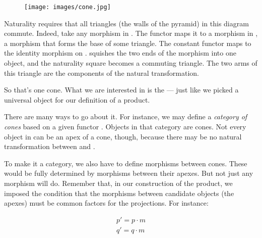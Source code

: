 \begin{figure}[H]
\centering
\texttt{[image: images/cone.jpg]}
\end{figure}

\noindent
Naturality requires that all triangles (the walls of the pyramid) in
this diagram commute. Indeed, take any morphism  in .
The functor  maps it to a morphism  in , a
morphism that forms the base of some triangle. The constant functor
 maps  to the identity morphism on
. \mathtext{\Delta} squishes the two ends of the morphism into one object, and
the naturality square becomes a commuting triangle. The two arms of this
triangle are the components of the natural transformation.

\begin{figure}[H]
\centering
{}
\end{figure}

\noindent
So that's one cone. What we are interested in is the  --- just like we picked a universal object for our definition of a
product.

There are many ways to go about it. For instance, we may define a
\emph{category of cones} based on a given functor . Objects in that
category are cones. Not every object  in  can be an
apex of a cone, though, because there may be no natural transformation
between  and .

To make it a category, we also have to define morphisms between cones.
These would be fully determined by morphisms between their apexes. But
not just any morphism will do. Remember that, in our construction of the
product, we imposed the condition that the morphisms between candidate
objects (the apexes) must be common factors for the projections. For
instance:

\begin{equation*}
\begin{split}
p' = p \cdot m \\
q' = q \cdot m
\end{split}
\end{equation*}

\begin{figure}[H]
    \centering
\end{figure}

